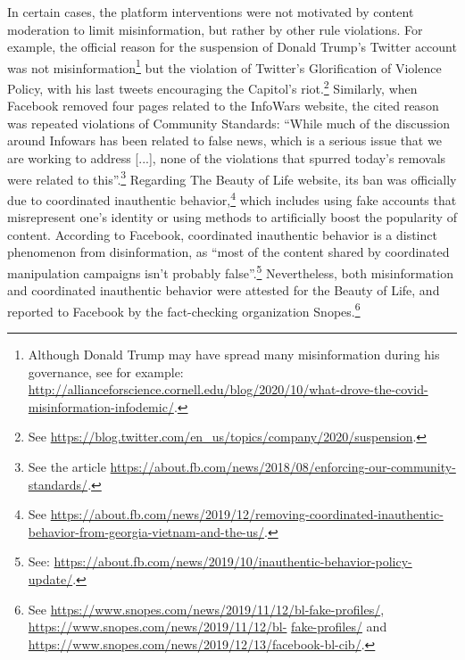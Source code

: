 \documentclass{article}
\begin{document}
\smallskip

In certain cases, the platform interventions were not motivated by content moderation to limit misinformation, but rather by other rule violations.
For example, the official reason for the suspension of Donald Trump's Twitter account was not misinformation\footnote{Although Donald Trump may have spread many misinformation during his governance, see for example: \href{http://allianceforscience.cornell.edu/blog/2020/10/what-drove-the-covid-misinformation-infodemic/}{http://allianceforscience.cornell.edu/blog/2020/10/what-drove-the-covid-misinformation-infodemic/}.}
but the violation of Twitter's Glorification of Violence Policy, with his last tweets encouraging the Capitol's riot.\footnote{See \href{https://blog.twitter.com/en\_us/topics/company/2020/suspension}{https://blog.twitter.com/en\_us/topics/company/2020/suspension}.}
Similarly, when Facebook removed four pages related to the InfoWars website, the cited reason was repeated violations of Community Standards: 
``While much of the discussion around Infowars has been related to false news, which is a serious issue that we are working to address [...], none of the violations that spurred today’s removals were related to this''.\footnote{See the article \href{https://about.fb.com/news/2018/08/enforcing-our-community-standards/}{https://about.fb.com/news/2018/08/enforcing-our-community-standards/}.}
Regarding The Beauty of Life website, its ban was officially due to coordinated inauthentic behavior,\footnote{See \href{https://about.fb.com/news/2019/12/removing-coordinated-inauthentic-behavior-from-georgia-vietnam-and-the-us/}{https://about.fb.com/news/2019/12/removing-coordinated-inauthentic-behavior-from-georgia-vietnam-and-the-us/}.} 
which includes using fake accounts that misrepresent one's identity or using methods to artificially boost the popularity of content. 
According to Facebook, coordinated inauthentic behavior is a distinct phenomenon from disinformation, as ``most of the content shared by coordinated manipulation campaigns isn’t probably false''.\footnote{See: \href{https://about.fb.com/news/2019/10/inauthentic-behavior-policy-update/}{https://about.fb.com/news/2019/10/inauthentic-behavior-policy-update/}.} 
Nevertheless, both misinformation and coordinated inauthentic behavior were attested for the Beauty of Life, and reported to Facebook by the fact-checking organization Snopes.\footnote{See \href{ https://www.snopes.com/news/2019/11/12/bl-fake-profiles/}{https://www.snopes.com/news/2019/11/12/bl-fake-profiles/}, 
\href{https://www.snopes.com/news/2019/11/12/bl-fake-profiles/}{https://www.snopes.com/news/2019/11/12/bl-} \href{https://www.snopes.com/news/2019/11/12/bl-fake-profiles/}{fake-profiles/}  and 
\href{https://www.snopes.com/news/2019/12/13/facebook-bl-cib/}{https://www.snopes.com/news/2019/12/13/facebook-bl-cib/}.} 
\end{document}
